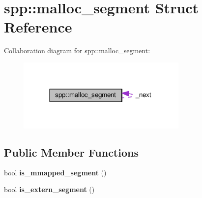 \hypertarget{structspp_1_1malloc__segment}{}\section{spp\+:\+:malloc\+\_\+segment Struct Reference}
\label{structspp_1_1malloc__segment}


Collaboration diagram for spp\+:\+:malloc\+\_\+segment\+:\nopagebreak
\begin{figure}[H]
\begin{center}
\leavevmode
\includegraphics[width=236pt]{structspp_1_1malloc__segment__coll__graph}
\end{center}
\end{figure}
\subsection*{Public Member Functions}
\begin{DoxyCompactItemize}
\item 
bool {\bfseries is\+\_\+mmapped\+\_\+segment} ()\hypertarget{structspp_1_1malloc__segment_ae63e9df7d7ed0b5b5fdc38ce01d40796}{}\label{structspp_1_1malloc__segment_ae63e9df7d7ed0b5b5fdc38ce01d40796}

\item 
bool {\bfseries is\+\_\+extern\+\_\+segment} ()\hypertarget{structspp_1_1malloc__segment_a4841aab8e9b2567a04bb2993f3cfe6cb}{}\label{structspp_1_1malloc__segment_a4841aab8e9b2567a04bb2993f3cfe6cb}

\end{DoxyCompactItemize}
